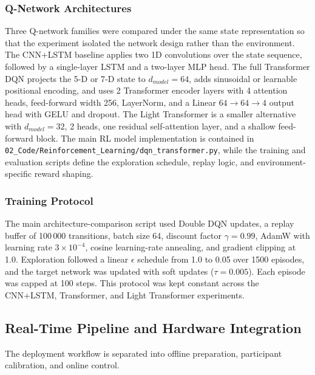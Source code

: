 \documentclass[12pt, a4paper]{article}
\begin{document}
\subsubsection{Q-Network Architectures}

Three Q-network families were compared under the same state representation so that the experiment isolated the network design rather than the environment. The CNN+LSTM baseline applies two 1D convolutions over the state sequence, followed by a single-layer LSTM and a two-layer MLP head. The full Transformer DQN projects the 5-D or 7-D state to $d_{model}=64$, adds sinusoidal or learnable positional encoding, and uses 2 Transformer encoder layers with 4 attention heads, feed-forward width 256, LayerNorm, and a Linear $64 \rightarrow 64 \rightarrow 4$ output head with GELU and dropout. The Light Transformer is a smaller alternative with $d_{model}=32$, 2 heads, one residual self-attention layer, and a shallow feed-forward block. The main RL model implementation is contained in \texttt{02\_Code/Reinforcement\_Learning/dqn\_transformer.py}, while the training and evaluation scripts define the exploration schedule, replay logic, and environment-specific reward shaping.

\subsubsection{Training Protocol}

The main architecture-comparison script used Double DQN updates, a replay buffer of 100\,000 transitions, batch size 64, discount factor $\gamma = 0.99$, AdamW with learning rate $3 \times 10^{-4}$, cosine learning-rate annealing, and gradient clipping at 1.0. Exploration followed a linear $\epsilon$ schedule from 1.0 to 0.05 over 1500 episodes, and the target network was updated with soft updates ($\tau = 0.005$). Each episode was capped at 100 steps. This protocol was kept constant across the CNN+LSTM, Transformer, and Light Transformer experiments.

\subsection{Real-Time Pipeline and Hardware Integration}

The deployment workflow is separated into offline preparation, participant calibration, and online control.
\end{document}
